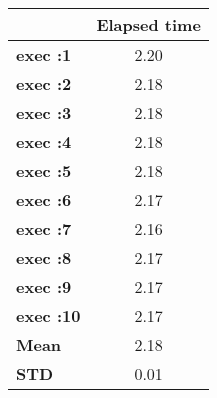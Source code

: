 \begin{tiny}\begin{tabular}{|l|c|}
\hline
&\textbf{Elapsed time}\\\hline
\textbf{exec :1}&2.20\\\hline
\textbf{exec :2}&2.18\\\hline
\textbf{exec :3}&2.18\\\hline
\textbf{exec :4}&2.18\\\hline
\textbf{exec :5}&2.18\\\hline
\textbf{exec :6}&2.17\\\hline
\textbf{exec :7}&2.16\\\hline
\textbf{exec :8}&2.17\\\hline
\textbf{exec :9}&2.17\\\hline
\textbf{exec :10}&2.17\\\hline
\textbf{ Mean}&2.18\\\hline
\textbf{ STD}&0.01\\\hline
\end{tabular}
\end{tiny}